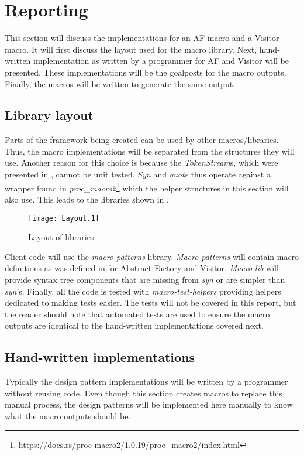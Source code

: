 \section{Reporting}
\label{sec:reporting}
This section will discuss the implementations for an AF macro and a Visitor macro.
It will first discuss the layout used for the macro library.
Next, hand-written implementation as written by a programmer for AF and Visitor will be presented.
These implementations will be the goalposts for the macro outputs.
Finally, the macros will be written to generate the same output.

\subsection{Library layout}
Parts of the framework being created can be used by other macros/libraries.
Thus, the macro implementations will be separated from the structures they will use.
Another reason for this choice is because the \textit{TokenStream}s, which were presented in , cannot be unit tested.
\textit{Syn} and \textit{quote} thus operate against a wrapper found in \textit{proc\_macro2}\footnote{https://docs.rs/proc-macro2/1.0.19/proc\_macro2/index.html} which the helper structures in this section will also use.
This leads to the libraries shown in .

\begin{figure}[h]
	\centering
	\texttt{[image: Layout.1]}
	\caption{Layout of libraries}
	\label{fig:LibraryLayout}
\end{figure}

Client code will use the \textit{macro-patterns} library.
\textit{Macro-patterns} will contain macro definitions as was defined in  for Abstract Factory and Visitor.
\textit{Macro-lib} will provide syntax tree components that are missing from \textit{syn} or are simpler than \textit{syn}'s.
Finally, all the code is tested with \textit{macro-test-helpers} providing helpers dedicated to making tests easier.
The tests will not be covered in this report, but the reader should note that automated tests are used to ensure the macro outputs are identical to the hand-written implementations covered next.

\subsection{Hand-written implementations}
\label{sec:hand-written}
Typically the design pattern implementations will be written by a programmer without reusing code.
Even though this section creates macros to replace this manual process, the design patterns will be implemented here manually to know what the macro outputs should be.

